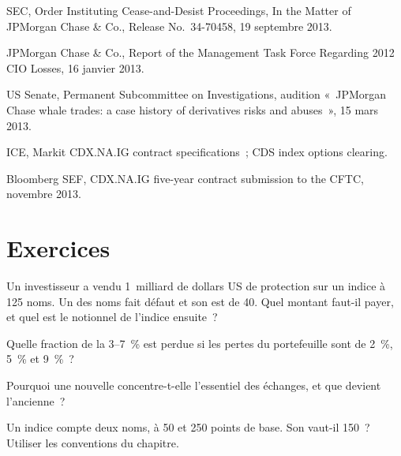 \begin{omsources}
\item SEC, Order Instituting Cease-and-Desist Proceedings, In the Matter of JPMorgan Chase \& Co., Release No.~34-70458, 19 septembre 2013. \item JPMorgan Chase \& Co., Report of the Management Task Force Regarding 2012 CIO
Losses, 16 janvier 2013.
\item US Senate, Permanent Subcommittee on Investigations, audition «~JPMorgan Chase
whale trades: a case history of derivatives risks and abuses~», 15 mars 2013.
\item ICE, Markit CDX.NA.IG contract specifications~; CDS index options clearing.
\item Bloomberg SEF, CDX.NA.IG five-year contract submission to the CFTC, novembre 2013.
\end{omsources}

\section{Exercices}

\begin{exercise}[$\star$]\label{exo:m2:credit-indices-and-tranches:1}
Un investisseur a vendu 1~milliard de dollars US de protection sur un indice à 125 noms. Un des noms fait défaut et son
 est de 40. Quel montant faut-il payer, et quel est le notionnel de l'indice ensuite~?
\end{exercise}

\begin{exercise}[$\star$]\label{exo:m2:credit-indices-and-tranches:2}
Quelle fraction de la  3--7~\% est perdue si les pertes du portefeuille sont de 2~\%, 5~\% et 9~\%~?
\end{exercise}

\begin{exercise}[$\star$]\label{exo:m2:credit-indices-and-tranches:3}
Pourquoi une nouvelle  concentre-t-elle l'essentiel des échanges, et que devient l'ancienne~?
\end{exercise}

\begin{exercise}[$\star\star$]\label{exo:m2:credit-indices-and-tranches:4}
Un indice compte deux noms, à 50 et 250 points de base. Son  vaut-il 150~? Utiliser
les conventions du chapitre.
\end{exercise}

